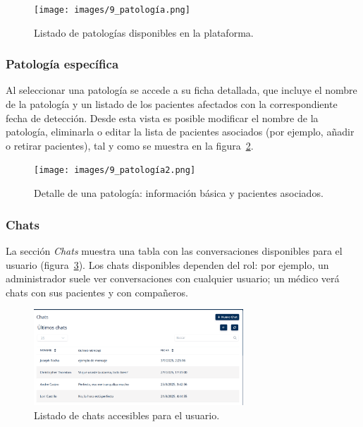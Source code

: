 \documentclass[12pt, a4paper]{article}
\begin{document}
\begin{umaappendices}
\vspace{-5pt}

\begin{figure}[htbp]
	\centering
	\texttt{[image: images/9\_patología.png]}
	\caption[Ejemplo]{Listado de patologías disponibles en la plataforma.}
	\label{fig:patol}
\end{figure}

\vspace{-20pt}

\subsubsection{Patología específica}
Al seleccionar una patología se accede a su ficha detallada, que incluye el nombre de la patología y un listado de los pacientes afectados con la correspondiente fecha de detección. Desde esta vista es posible modificar el nombre de la patología, eliminarla o editar la lista de pacientes asociados (por ejemplo, añadir o retirar pacientes), tal y como se muestra en la figura~\ref{fig:patolo}.

\vspace{-5pt}

\begin{figure}[htbp]
	\centering
	\texttt{[image: images/9\_patología2.png]}
	\caption[Ejemplo]{Detalle de una patología: información básica y pacientes asociados.}
	\label{fig:patolo}
\end{figure}

\subsubsection{Chats}
La sección \textit{Chats} muestra una tabla con las conversaciones disponibles para el usuario (figura~\ref{fig:chat1}). Los chats disponibles dependen del rol: por ejemplo, un administrador suele ver conversaciones con cualquier usuario; un médico verá chats con sus pacientes y con compañeros.
\vspace{-5pt}

\begin{figure}[htbp]
	\centering
	\includegraphics[width=0.7\textwidth]{images/10_chat.png}
	\caption[Ejemplo]{Listado de chats accesibles para el usuario.}
	\label{fig:chat1}
\end{figure}
\vspace{-15pt}


\end{umaappendices}
\end{document}
